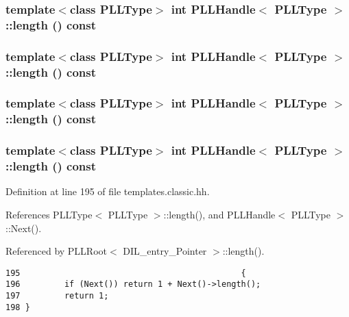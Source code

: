 \subsubsection{\setlength{\rightskip}{0pt plus 5cm}template$<$class PLLType$>$ int PLLHandle$<$ {\bf PLLType} $>$::length () const\hspace{0.3cm}{\tt  [inline]}}\label{classPLLHandle_a47}


\subsubsection{\setlength{\rightskip}{0pt plus 5cm}template$<$class PLLType$>$ int PLLHandle$<$ {\bf PLLType} $>$::length () const\hspace{0.3cm}{\tt  [inline]}}\label{classPLLHandle_a34}


\subsubsection{\setlength{\rightskip}{0pt plus 5cm}template$<$class PLLType$>$ int PLLHandle$<$ {\bf PLLType} $>$::length () const\hspace{0.3cm}{\tt  [inline]}}\label{classPLLHandle_a21}


\subsubsection{\setlength{\rightskip}{0pt plus 5cm}template$<$class PLLType$>$ int PLLHandle$<$ {\bf PLLType} $>$::length () const\hspace{0.3cm}{\tt  [inline]}}\label{classPLLHandle_a8}




Definition at line 195 of file templates.classic.hh.

References PLLType$<$ PLLType $>$::length(), and PLLHandle$<$ PLLType $>$::Next().

Referenced by PLLRoot$<$ DIL\_\-entry\_\-Pointer $>$::length().



\footnotesize\begin{verbatim}195                                             { 
196         if (Next()) return 1 + Next()->length(); 
197         return 1; 
198 } 
\end{verbatim}\normalsize 
{}
